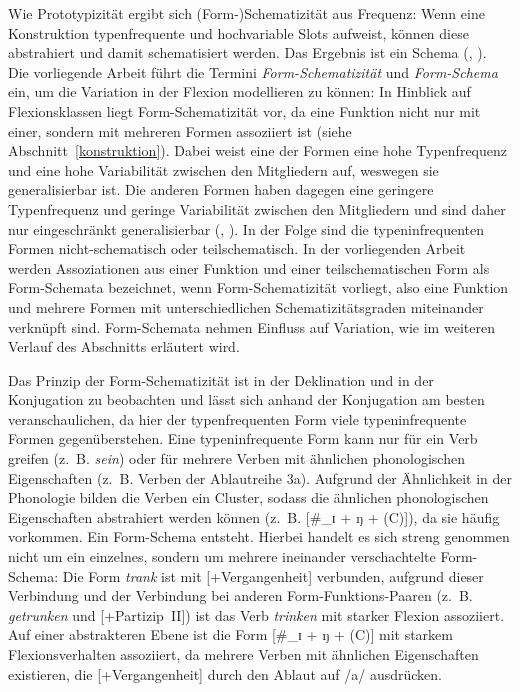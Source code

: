 Wie Prototypizität ergibt sich (Form-)Schematizität aus Frequenz: Wenn eine Kon\-struk\-tion typenfrequente und hochvariable Slots aufweist, können diese abstrahiert und damit schematisiert werden. Das Ergebnis ist ein Schema (\cite[168--170]{Ellis.2002b}, \cite[80]{Bybee.2010}). Die vorliegende Arbeit führt die Termini \textit{Form-Schematizität} und \textit{Form-Schema} ein, um die Variation in der Flexion modellieren zu können: In Hinblick auf Flexionsklassen liegt Form-Schematizität vor, da eine Funktion nicht nur mit einer, sondern mit mehreren Formen assoziiert ist (siehe Abschnitt~\ref{konstruktion}). Dabei weist eine der Formen eine hohe Typenfrequenz und eine hohe Variabilität zwischen den Mitgliedern auf, weswegen sie generalisierbar ist. Die anderen Formen haben dagegen eine geringere Typenfrequenz und geringe Variabilität zwischen den Mitgliedern und sind daher nur eingeschränkt generalisierbar (\cite[69]{Bybee.2010}, \cite[64--65]{Goldberg.2019}). In der Folge sind die typeninfrequenten Formen nicht-schematisch oder teilschematisch.  In der vorliegenden Arbeit werden Assoziationen aus einer Funktion und einer teilschematischen Form als Form-Schemata bezeichnet, wenn Form-Schematizität vorliegt, also eine Funktion und mehrere Formen mit unterschiedlichen Schematizitätsgraden miteinander verknüpft sind. Form-Schemata nehmen Einfluss auf Variation, wie im weiteren Verlauf des Abschnitts erläutert wird.

Das Prinzip der Form-Schematizität ist in der Deklination und in der Konjugation zu beobachten und lässt sich anhand der Konjugation am besten veranschaulichen, da hier der typenfrequenten Form viele typeninfrequente Formen gegenüberstehen. Eine typeninfrequente Form kann nur für ein Verb greifen (z.~B. \textit{sein}) oder für mehrere Verben mit ähnlichen phonologischen Eigenschaften (z.~B. Verben der Ablautreihe 3a). Aufgrund der Ähnlichkeit in der Phonologie bilden die Verben ein Cluster, sodass die ähnlichen phonologischen Eigenschaften abstrahiert werden können (z.~B. [\#\_ɪ + ŋ + (C)]), da sie häufig vorkommen. Ein Form-Schema entsteht. Hierbei handelt es sich streng genommen nicht um ein einzelnes, sondern um mehrere ineinander verschachtelte Form-Schema: Die Form \textit{trank} ist mit [+Vergangenheit] verbunden, aufgrund dieser Verbindung und der Verbindung bei anderen Form-Funktions-Paaren (z.~B. \textit{getrunken} und [+Partizip~II]) ist das Verb \textit{trinken} mit starker Flexion assoziiert. Auf einer abstrakteren Ebene ist die Form [\#\_ɪ + ŋ + (C)] mit starkem Flexionsverhalten assoziiert, da mehrere Verben mit ähnlichen Eigenschaften existieren, die [+Vergangenheit] durch den Ablaut auf /a/ ausdrücken.


